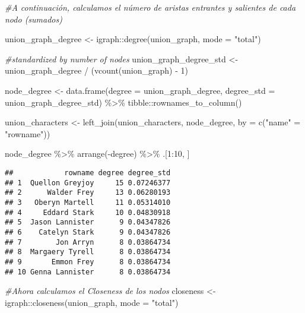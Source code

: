 \documentclass[
]{book}
\newenvironment{Shaded}{\begin{snugshade}}{\end{snugshade}}
\newcommand{\AttributeTok}[1]{\textcolor[rgb]{0.77,0.63,0.00}{#1}}
\newcommand{\CommentTok}[1]{\textcolor[rgb]{0.56,0.35,0.01}{\textit{#1}}}
\newcommand{\DecValTok}[1]{\textcolor[rgb]{0.00,0.00,0.81}{#1}}
\newcommand{\FunctionTok}[1]{\textcolor[rgb]{0.00,0.00,0.00}{#1}}
\newcommand{\NormalTok}[1]{#1}
\newcommand{\OtherTok}[1]{\textcolor[rgb]{0.56,0.35,0.01}{#1}}
\newcommand{\SpecialCharTok}[1]{\textcolor[rgb]{0.00,0.00,0.00}{#1}}
\newcommand{\StringTok}[1]{\textcolor[rgb]{0.31,0.60,0.02}{#1}}
\begin{document}
\begin{Shaded}
\begin{Highlighting}[]
\CommentTok{\#A continuación, calculamos el número de aristas entrantes y salientes de cada nodo (sumados)}

\NormalTok{union\_graph\_degree }\OtherTok{\textless{}{-}}\NormalTok{ igraph}\SpecialCharTok{::}\FunctionTok{degree}\NormalTok{(union\_graph, }\AttributeTok{mode =} \StringTok{"total"}\NormalTok{)}

\CommentTok{\#standardized by number of nodes}
\NormalTok{union\_graph\_degree\_std }\OtherTok{\textless{}{-}}\NormalTok{ union\_graph\_degree }\SpecialCharTok{/}\NormalTok{ (}\FunctionTok{vcount}\NormalTok{(union\_graph) }\SpecialCharTok{{-}} \DecValTok{1}\NormalTok{)}


\NormalTok{node\_degree }\OtherTok{\textless{}{-}} \FunctionTok{data.frame}\NormalTok{(}\AttributeTok{degree =}\NormalTok{ union\_graph\_degree,}
                          \AttributeTok{degree\_std =}\NormalTok{ union\_graph\_degree\_std) }\SpecialCharTok{\%\textgreater{}\%}
\NormalTok{  tibble}\SpecialCharTok{::}\FunctionTok{rownames\_to\_column}\NormalTok{()}

\NormalTok{union\_characters }\OtherTok{\textless{}{-}} \FunctionTok{left\_join}\NormalTok{(union\_characters, node\_degree, }\AttributeTok{by =} \FunctionTok{c}\NormalTok{(}\StringTok{"name"} \OtherTok{=} \StringTok{"rowname"}\NormalTok{))}

\NormalTok{node\_degree }\SpecialCharTok{\%\textgreater{}\%}
  \FunctionTok{arrange}\NormalTok{(}\SpecialCharTok{{-}}\NormalTok{degree) }\SpecialCharTok{\%\textgreater{}\%}
\NormalTok{  .[}\DecValTok{1}\SpecialCharTok{:}\DecValTok{10}\NormalTok{, ]}
\end{Highlighting}
\end{Shaded}

\begin{verbatim}
##            rowname degree degree_std
## 1  Quellon Greyjoy     15 0.07246377
## 2      Walder Frey     13 0.06280193
## 3   Oberyn Martell     11 0.05314010
## 4     Eddard Stark     10 0.04830918
## 5  Jason Lannister      9 0.04347826
## 6    Catelyn Stark      9 0.04347826
## 7        Jon Arryn      8 0.03864734
## 8  Margaery Tyrell      8 0.03864734
## 9       Emmon Frey      8 0.03864734
## 10 Genna Lannister      8 0.03864734
\end{verbatim}

\begin{Shaded}
\begin{Highlighting}[]
\CommentTok{\#Ahora calculamos el \textquotesingle{}Closeness\textquotesingle{} de los nodos}
\NormalTok{closeness }\OtherTok{\textless{}{-}}\NormalTok{ igraph}\SpecialCharTok{::}\FunctionTok{closeness}\NormalTok{(union\_graph, }\AttributeTok{mode =} \StringTok{"total"}\NormalTok{)}
\end{Highlighting}
\end{Shaded}
\end{document}
